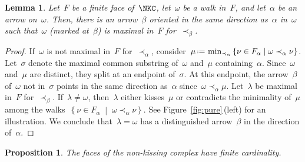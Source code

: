 \documentclass{amsart}
\newtheorem{proposition}[theorem]{Proposition}
\newtheorem{lemma}[theorem]{Lemma}
\theoremstyle{definition}
\newcommand{\set}[2]{\left\{ #1 \;\middle|\; #2 \right\}} %
\newcommand{\eqdef}{\mbox{\,\raisebox{0.2ex}{\scriptsize\ensuremath{\mathrm:}}\ensuremath{=}\,}} %
\newcommand{\fref}[1]{Figure~\ref{#1}} %
\begin{document}
\begin{lemma}\label{lem:distArrowExist}
Let~$F$ be a finite face of~$\NKC$, let~$\omega$ be a walk in~$F$, and let~$\alpha$ be an arrow on~$\omega$.
Then, there is an arrow~$\beta$ oriented in the same direction as~$\alpha$ in~$\omega$ such that~$\omega$ (marked at~$\beta$) is maximal in~$F$ for~$\prec_\beta$.
\end{lemma}

\begin{proof}
If~$\omega$ is not maximal in~$F$ for~$\prec_\alpha$, consider~${\mu \eqdef \min_{\prec_\alpha} \set{\nu \in F_\alpha}{\omega \prec_\alpha \nu}}$.
Let~$\sigma$ denote the maximal common substring of~$\omega$ and~$\mu$ containing~$\alpha$.
Since~$\omega$ and~$\mu$ are distinct, they split at an endpoint of~$\sigma$.
At this endpoint, the arrow~$\beta$ of~$\omega$ not in~$\sigma$ points in the same direction as~$\alpha$ since~$\omega \prec_\alpha \mu$.
Let~$\lambda$ be maximal in~$F$ for~$\prec_\beta$.
If~$\lambda \ne \omega$, then~$\lambda$ either kisses~$\mu$ or contradicts the minimality of~$\mu$ among the walks~$\set{\nu \in F_\alpha}{\omega \prec_\alpha \nu}$.
See \fref{fig:pure}\,(left) for an illustration.
We conclude that~$\lambda = \omega$ has a distinguished arrow~$\beta$ in the direction of~$\alpha$.
\end{proof}

\begin{proposition}\label{prop:nkFacetsAreFinite}
The faces of the non-kissing complex have finite cardinality.
\end{proposition}
\end{document}
